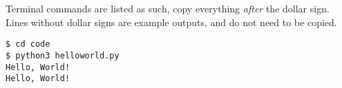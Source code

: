 Terminal commands are listed as such, copy everything \textit{after} the dollar sign. Lines without dollar signs are example outputs, and do not need to be copied.
			
\begin{lstlisting}[style=Terminal]
$ cd code
$ python3 helloworld.py 
Hello, World!
Hello, World!
\end{lstlisting}